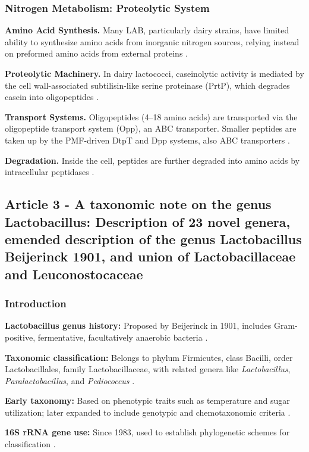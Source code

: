 \subsubsection{Nitrogen Metabolism: Proteolytic System}
\textbf{Amino Acid Synthesis.} Many LAB, particularly dairy strains, have limited ability to synthesize amino acids from inorganic nitrogen sources, relying instead on preformed amino acids from external proteins \cite*{L3-LAB}.

\textbf{Proteolytic Machinery.} In dairy lactococci, caseinolytic activity is mediated by the cell wall-associated subtilisin-like serine proteinase (PrtP), which degrades casein into oligopeptides \cite*{L3-LAB}.

\textbf{Transport Systems.} Oligopeptides (4–18 amino acids) are transported via the oligopeptide transport system (Opp), an ABC transporter. Smaller peptides are taken up by the PMF-driven DtpT and Dpp systems, also ABC transporters \cite*{L3-LAB}.

\textbf{Degradation.} Inside the cell, peptides are further degraded into amino acids by intracellular peptidases \cite*{L3-LAB}.

\subsection{Article 3 - A taxonomic note on the genus Lactobacillus: Description of 23 novel genera, emended description of the genus Lactobacillus Beijerinck 1901, and union of Lactobacillaceae and Leuconostocaceae}
\subsubsection*{Introduction}

\textbf{Lactobacillus genus history:} Proposed by Beijerinck in 1901, includes Gram-positive, fermentative, facultatively anaerobic bacteria \cite*{L3-TaxNotes}.

\textbf{Taxonomic classification:} Belongs to phylum Firmicutes, class Bacilli, order Lactobacillales, family Lactobacillaceae, with related genera like \textit{Lactobacillus}, \textit{Paralactobacillus}, and \textit{Pediococcus} \cite*{L3-TaxNotes}.

\textbf{Early taxonomy:} Based on phenotypic traits such as temperature and sugar utilization; later expanded to include genotypic and chemotaxonomic criteria \cite*{L3-TaxNotes}.

\textbf{16S rRNA gene use:} Since 1983, used to establish phylogenetic schemes for classification \cite*{L3-TaxNotes}.

